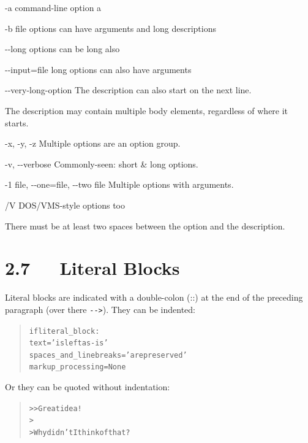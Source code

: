 \documentclass[a4paper]{memoir}
\providecommand*{\DUoptionlistlabel}[1]{\bfseries #1 \hfill}
\newenvironment{DUoptionlist}{%
    \list{}{\setlength{\labelwidth}{\DUoptionlistindent}
            \setlength{\rightmargin}{1cm}
            \setlength{\leftmargin}{\rightmargin}
            \addtolength{\leftmargin}{\labelwidth}
            \addtolength{\leftmargin}{\labelsep}
            \renewcommand{\makelabel}{\DUoptionlistlabel}}
  }
  {\endlist}
\begin{document}
\begin{DUoptionlist}
\item[-a]  command-line option \textquotedbl{}a\textquotedbl{}

\item[-b file]  options can have arguments
and long descriptions

\item[-{}-long]  options can be long also

\item[-{}-input=file]  long options can also have
arguments

\item[-{}-very-long-option]  The description can also start on the next line.

The description may contain multiple body elements,
regardless of where it starts.

\item[-x, -y, -z]  Multiple options are an \textquotedbl{}option group\textquotedbl{}.

\item[-v, -{}-verbose]  Commonly-seen: short \& long options.

\item[-1 file, -{}-one=file, -{}-two file]  Multiple options with arguments.

\item[/V]  DOS/VMS-style options too
\end{DUoptionlist}

There must be at least two spaces between the option and the
description.


\section{2.7   Literal Blocks%
  \label{literal-blocks}%
}

Literal blocks are indicated with a double-colon (\textquotedbl{}::\textquotedbl{}) at the end of
the preceding paragraph (over there \texttt{-{}->}).  They can be indented:

\begin{quote}
\begin{alltt}
if literal_block:
    text = 'is left as-is'
    spaces_and_linebreaks = 'are preserved'
    markup_processing = None
\end{alltt}
\end{quote}

Or they can be quoted without indentation:

\begin{quote}
\begin{alltt}
>> Great idea!
>
> Why didn't I think of that?
\end{alltt}
\end{quote}
\end{document}
